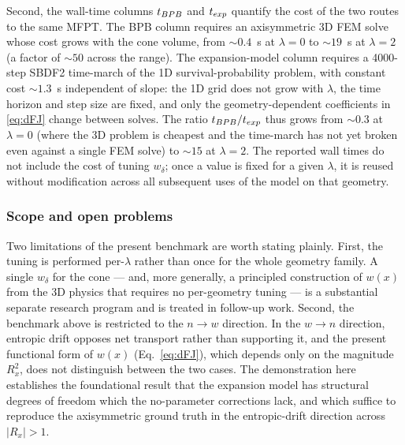 \documentclass[11pt]{article}
\begin{document}
Second, the wall-time columns $t_{\rm BPB}$ and $t_{\rm exp}$ quantify the cost of the two routes to the same MFPT. The BPB column requires an axisymmetric 3D FEM solve whose cost grows with the cone volume, from $\sim\!0.4$~s at $\lambda = 0$ to $\sim\!19$~s at $\lambda = 2$ (a factor of $\sim\!50$ across the range). The expansion-model column requires a 4000-step SBDF2 time-march of the 1D survival-probability problem, with constant cost $\sim\!1.3$~s independent of slope: the 1D grid does not grow with $\lambda$, the time horizon and step size are fixed, and only the geometry-dependent coefficients in \eqref{eq:dFJ} change between solves. The ratio $t_{\rm BPB}/t_{\rm exp}$ thus grows from $\sim\!0.3$ at $\lambda = 0$ (where the 3D problem is cheapest and the time-march has not yet broken even against a single FEM solve) to $\sim\!15$ at $\lambda = 2$. The reported wall times do not include the cost of tuning $w_\delta$; once a value is fixed for a given $\lambda$, it is reused without modification across all subsequent uses of the model on that geometry.

\subsubsection{Scope and open problems}\label{sec:bpb-followup}

Two limitations of the present benchmark are worth stating plainly. First, the tuning is performed per-$\lambda$ rather than once for the whole geometry family. A single $w_\delta$ for the cone --- and, more generally, a principled construction of $w(x)$ from the 3D physics that requires no per-geometry tuning --- is a substantial separate research program and is treated in follow-up work. Second, the benchmark above is restricted to the $n \to w$ direction. In the $w \to n$ direction, entropic drift opposes net transport rather than supporting it, and the present functional form of $w(x)$ (Eq.~\eqref{eq:dFJ}), which depends only on the magnitude $R_x^2$, does not distinguish between the two cases. The demonstration here establishes the foundational result that the expansion model has structural degrees of freedom which the no-parameter corrections lack, and which suffice to reproduce the axisymmetric ground truth in the entropic-drift direction across $|R_x| > 1$.
\end{document}
